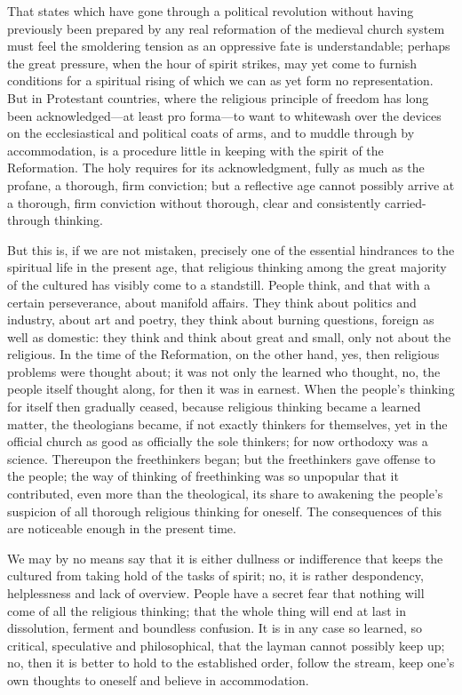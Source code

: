 \documentclass[12pt]{book}
\newcommand{\opage}[1]{\marginnote{\footnotesize\textit{[#1]}}}
\begin{document}
That states which have gone through a political revolution without
having previously been prepared by any real reformation of the medieval
church system must feel the smoldering tension as an oppressive fate is
understandable; perhaps the great pressure, when the hour of spirit
strikes, may yet come to furnish conditions for a spiritual rising of
which we can as yet form no representation. But in Protestant countries,
where the religious principle of freedom has long been
acknowledged---at least pro forma---to want to whitewash over the
devices on the ecclesiastical and political coats of arms, and to muddle
through by accommodation, is a procedure little in keeping with the
spirit of the Reformation. The holy requires for its acknowledgment,
fully as much as the profane, a thorough, firm conviction; but a
reflective age cannot possibly arrive at a thorough, firm conviction
without thorough, clear and consistently carried-through thinking.

But this is, if we are not mistaken, precisely one of the essential
hindrances to the spiritual life in the present age, that religious
thinking among the great majority of the cultured has visibly come to a
standstill. People think, and that with a certain perseverance, about
manifold affairs. They think about politics and industry, about art and
poetry, they think about burning questions, foreign as well as domestic:
they think and think about great and small, only not about the
religious. In the time of the Reformation, on the other hand, yes, then
religious problems were thought about; it was not only the learned who
thought, no, the people itself thought along, for then it was in earnest.
When the people's thinking for itself then gradually ceased, because
religious thinking became a learned matter, the theologians became, if
not exactly thinkers for themselves, yet in the
\opage{109}\setcounter{footnote}{0}%
official church as good as officially the sole thinkers; for now
orthodoxy was a science. Thereupon the freethinkers began; but the
freethinkers gave offense to the people; the way of thinking of
freethinking was so unpopular that it contributed, even more than the
theological, its share to awakening the people's suspicion of all
thorough religious thinking for oneself. The consequences of this are
noticeable enough in the present time.

We may by no means say that it is either dullness or indifference that
keeps the cultured from taking hold of the tasks of spirit; no, it is
rather despondency, helplessness and lack of overview. People have a
secret fear that nothing will come of all the religious thinking; that
the whole thing will end at last in dissolution, ferment and boundless
confusion. It is in any case so learned, so critical, speculative and
philosophical, that the layman cannot possibly keep up; no, then it is
better to hold to the established order, follow the stream, keep one's
own thoughts to oneself and believe in accommodation.
\end{document}
